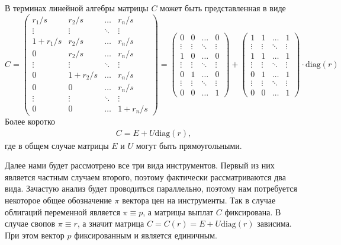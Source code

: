 \documentclass[10pt]{article}
\theoremstyle{definition}
\theoremstyle{remark}
\theoremstyle{plain}
\newcommand{\diag}{\mathrm{diag}}
\begin{document}
В терминах линейной алгебры матрицы $C$ может быть представленная в виде
$$
C = 
\begin{pmatrix}
r_1/s& r_2/s &\ldots & r_n/s\\
\vdots& \vdots &\ddots & \vdots\\
1+r_1/s& r_2/s &\ldots & r_n/s\\
0& r_2/s &\ldots & r_n/s\\
\vdots& \vdots &\ddots & \vdots\\
0& 1+r_2/s &\ldots & r_n/s\\
0& 0 &\ldots & r_n/s \\
\vdots& \vdots &\ddots & \vdots\\
0& 0 &\ldots & 1+r_n/s
\end{pmatrix}
=
\begin{pmatrix}
0& 0 &\ldots & 0\\
\vdots& \vdots &\ddots & \vdots\\
1& 0 &\ldots & 0\\
\vdots& \vdots &\ddots & \vdots\\
0& 1 &\ldots & 0\\
\vdots& \vdots &\ddots & \vdots\\
0& 0 &\ldots & 1
\end{pmatrix}
+
\begin{pmatrix}
1& 1 &\ldots & 1\\
\vdots& \vdots &\ddots & \vdots\\
1& 1 &\ldots & 1\\
\vdots& \vdots &\ddots & \vdots\\
0& 1 &\ldots & 1\\
\vdots& \vdots &\ddots & \vdots\\
0& 0 &\ldots & 1
\end{pmatrix}
\cdot\diag(r)
$$
Более коротко
\begin{align}
C = E+U\diag(r),
\end{align}
где в общем случае матрицы $E$ и $U$ могут быть прямоугольными.

Далее нами будет рассмотрено все три вида инструментов. Первый из них является частным случаем второго, поэтому фактически рассматриваются два вида. Зачастую анализ будет проводиться параллельно, поэтому нам потребуется некоторое общее обозначение $\pi$ вектора цен на инструменты. Так в случае облигаций переменной является $\pi\equiv p$, а матрицы выплат $C$ фиксирована. В случае свопов $\pi \equiv r$, а значит матрица $C = C(r) = E+U\diag(r)$ зависима. При этом вектор $p$ фиксированным и является единичным.
\end{document}
